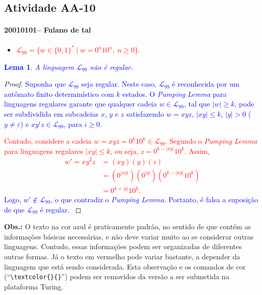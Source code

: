 \documentclass[12pt]{article}
\def\discente{Fulano de tal}
\def\matricula{20010101}
\def\aa{10}
\def\myling{{99}} %
\newtheorem{lema}{Lema}
\begin{document}
\subsection*{Atividade AA-\aa}
 \paragraph{\matricula -- \discente}
%
 \begin{itemize}
  \item \textcolor{red}{$\mathcal{L}_{\myling} = \{w\in\{0,1\}^*\mid w = 0^n10^n,\ n \geqslant 0\}$.}
\end{itemize}
%
\textcolor{blue}{
\begin{lema}
A linguagem $\mathcal{L}_{\myling}$ não é regular.
\end{lema}
}
%
\begin{proof}
\textcolor{blue}{Suponha que $\mathcal{L}_{\myling}$ seja regular. Neste caso,  $\mathcal{L}_{\myling}$ é reconhecida por um autômato finito determinístico com $k$ estados. O \emph{Pumping Lemma} para linguagens regulares garante que qualquer cadeia $w\in  \mathcal{L}_{\myling}$, tal que $|w|\geqslant k$, pode ser subdividida em subcadeias $x$, $y$ e $z$ satisfazendo $w=xyz$, $|xy|\leqslant k$, $|y|>0$ ($y\neq\varepsilon$) e $xy^iz\in \mathcal{L}_{\myling}$, para $i\geqslant 0$.}

\textcolor{red}{Contudo, considere a cadeia $w=xyz=0^k10^k\in \mathcal{L}_{\myling}$. Segundo o \emph{Pumping Lemma} para linguagens regulares $|xy|\leqslant k$, ou seja, $z=0^{k-|xy|}10^k$. Assim,
\begin{align*}
 w' = xy^2z &= (xy)(y)(z)\\
            &= (0^{|xy|})(0^{|y|})(0^{k-|xy|}10^k)\\
            &= 0^{k+|y|}10^k.
\end{align*}}
\textcolor{blue}{Logo, $w'\notin\mathcal{L}_{\myling}$, o que contradiz o \emph{Pumping Lemma}. Portanto, é falsa a suposição de que $\mathcal{L}_{\myling}$ é regular. }
\end{proof}
%
\noindent\textbf{Obs.:} O texto na cor azul é praticamente padrão, no sentido de que contém as informações básicas necessárias, e não deve variar muito ao se considerar outras linguagens. Contudo, essas informações podem ser organizadas de diferentes outras formas. Já o texto em vermelho pode variar bastante, a depender da linguagem que está sendo considerada. Esta observação e os comandos de cor (``\verb|\textcolor{}{}|'') podem ser removidos da versão a ser submetida na plataforma Turing.
\end{document}
